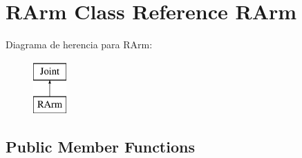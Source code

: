 \hypertarget{class_r_arm}{\section{{\-R\-Arm \-Class \-Reference} \-R\-Arm}
\label{class_r_arm}
}
\-Diagrama de herencia para \-R\-Arm\-:\begin{figure}[H]
\begin{center}
\leavevmode
\includegraphics[height=2.000000cm]{class_r_arm}
\end{center}
\end{figure}
\subsection*{\-Public \-Member \-Functions}
